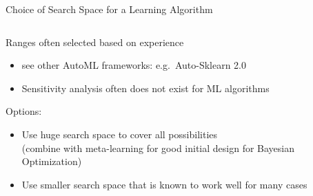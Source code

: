 \begin{frame}{Choice of Search Space for a Learning Algorithm}
  \begin{columns}
    \begin{column}{0.6\textwidth}
    Ranges often selected based on experience
    \begin{itemize}
      \item see other AutoML frameworks: e.g.\ Auto-Sklearn 2.0~
      \item Sensitivity analysis often does not exist for ML algorithms
    \end{itemize}
    Options:
    \begin{itemize}
      \item Use huge search space to cover all possibilities \\ 
            (combine with meta-learning for good initial design for Bayesian Optimization)
      \item Use smaller search space that is known to work well for many cases
    \end{itemize}
    \end{column}%
    \begin{column}{0.4\textwidth}
      \begin{center}
\end{center}
\end{column}
\end{columns}
\end{frame}
